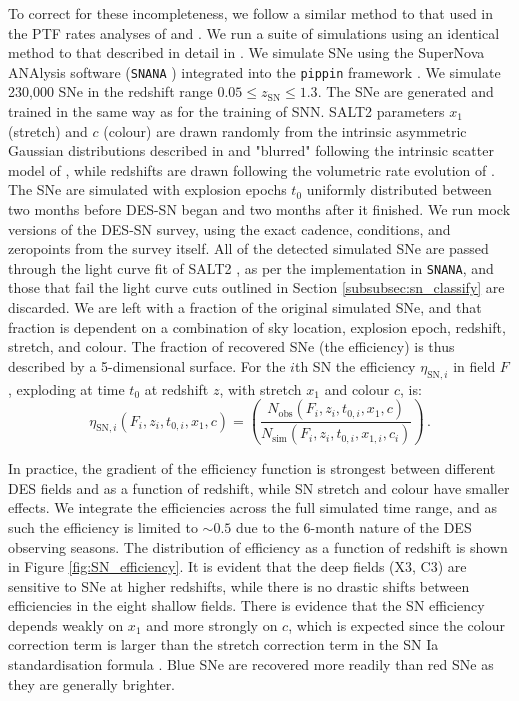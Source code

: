 \documentclass[fleqn,usenatbib]{mnras}
\begin{document}
To correct for these incompleteness, we follow a similar method to that used in the PTF rates analyses of \citet{Frohmaier2019} and \citet{Frohmaier2020}. We run a suite of simulations using an identical method to that described in detail in \citet{Vincenzi2020}. We simulate SNe using the SuperNova ANAlysis software (\texttt{SNANA} \citealt{Kessler2009a}) integrated into the \texttt{pippin} framework \citep{Hinton2020}. We simulate 230,000 SNe in the redshift range $0.05 \leq z_{\mathrm{SN}} \leq 1.3$. The SNe are generated and trained in the same way as for the training of SNN. SALT2 parameters $x_1$ (stretch) and $c$ (colour) are drawn randomly from the intrinsic asymmetric Gaussian distributions described in \citet{Scolnic2016} and "blurred" following the intrinsic scatter model of \citet{Guy2010}, while redshifts are drawn following the volumetric rate evolution of \citet{Frohmaier2019}. The SNe are simulated with explosion epochs $t_0$ uniformly distributed between two months before DES-SN began and two months after it finished. We run mock versions of the DES-SN survey, using the exact cadence, conditions, and zeropoints from the survey itself. All of the detected simulated SNe are passed through the light curve fit of SALT2 \citep{Betoule2014}, as per the implementation in \texttt{SNANA}, and those that fail the light curve cuts outlined in Section \ref{subsubsec:sn_classify} are discarded. We are left with a fraction of the original simulated SNe, and that fraction is dependent on a combination of sky location, explosion epoch, redshift, stretch, and colour. The fraction of recovered SNe (the efficiency) is thus described by a 5-dimensional surface. For the $i$th SN the efficiency $\eta_{\mathrm{SN}, i}$ in field $F$, exploding at time $t_0$ at redshift $z$, with stretch $x_1$ and colour $c$, is:
\begin{equation}
    \eta_{\mathrm{SN},i} (F_i,z_i,t_{0,i},x_1,c) = \left( \frac{N_{\mathrm{obs}}\left(F_i,z_i,t_{0,i},x_1,c\right)}{N_{\mathrm{sim}}\left(F_i,z_i,t_{0,i},x_{1,i},c_i\right)}\right)\,.
\end{equation}

In practice, the gradient of the efficiency function is strongest between different DES fields and as a function of redshift, while SN stretch and colour have smaller effects. We integrate the efficiencies across the full simulated time range, and as such the efficiency is limited to $\sim 0.5$ due to the 6-month nature of the DES observing seasons.
The distribution of efficiency as a function of redshift is shown in Figure \ref{fig:SN_efficiency}. It is evident that the deep fields (X3, C3) are sensitive to SNe at higher redshifts, while there is no drastic shifts between efficiencies in the eight shallow fields. There is evidence that the SN efficiency depends weakly on $x_1$ and more strongly on $c$, which is expected since the colour correction term is larger than the stretch correction term in the SN Ia standardisation formula \citep{Tripp1998}. Blue SNe are recovered more readily than red SNe as they are generally brighter. 
\end{document}
